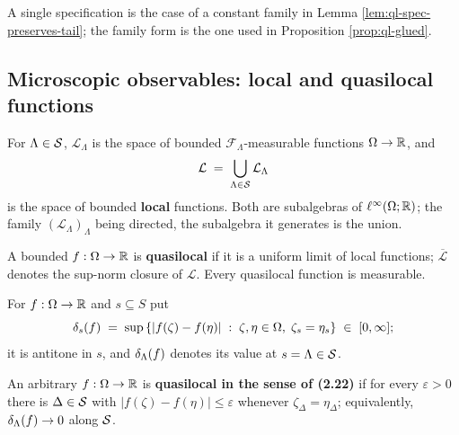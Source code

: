 \begin{remark}
    \label{rmk:ql-tail-family}
    A single specification is the case of a constant family in
    Lemma \ref{lem:ql-spec-preserves-tail}; the family form is the one used in
    Proposition \ref{prop:ql-glued}.
\end{remark}

\subsection*{Microscopic observables: local and quasilocal functions}

\begin{definition}
    \label{def:ql-local}
    \leanok

    For $\Lambda \in \mathcal{S}$, $\mathcal{L}_\Lambda$ is the space of bounded
    $\mathcal{F}_\Lambda$-measurable functions $\Omega \to \mathbb{R}$, and
    \[\mathcal{L} \;=\; \bigcup_{\Lambda \in \mathcal{S}} \mathcal{L}_\Lambda\]
    is the space of bounded \textbf{local} functions. Both are subalgebras of
    $\ell^\infty(\Omega; \mathbb{R})$; the family $(\mathcal{L}_\Lambda)_\Lambda$ being directed, the
    subalgebra it generates is the union.
\end{definition}

\begin{definition}
    \label{def:ql-quasilocal}
    \leanok

    A bounded $f : \Omega \to \mathbb{R}$ is \textbf{quasilocal} if it is a uniform limit of local
    functions; $\overline{\mathcal{L}}$ denotes the sup-norm closure of $\mathcal{L}$. Every
    quasilocal function is measurable.
\end{definition}

\begin{definition}
    \label{def:ql-osc}
    \leanok

    For $f : \Omega \to \mathbb{R}$ and $s \subseteq S$ put
    \[\delta_s(f) \;=\; \sup\left\{ |f(\zeta) - f(\eta)| \;:\; \zeta, \eta \in \Omega,\;
      \zeta_s = \eta_s \right\} \;\in\; [0,\infty];\]
    it is antitone in $s$, and $\delta_\Lambda(f)$ denotes its value at $s = \Lambda \in \mathcal{S}$.

    An arbitrary $f : \Omega \to \mathbb{R}$ is \textbf{quasilocal in the sense of (2.22)} if for every
    $\varepsilon > 0$ there is $\Delta \in \mathcal{S}$ with $|f(\zeta) - f(\eta)| \leq \varepsilon$
    whenever $\zeta_\Delta = \eta_\Delta$; equivalently, $\delta_\Lambda(f) \to 0$ along $\mathcal{S}$.
\end{definition}

